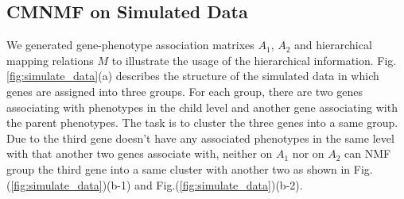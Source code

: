 \documentclass{bmcart}
\begin{document}
\subsection*{CMNMF on Simulated Data}
We generated gene-phenotype association matrixes $A_1$, $A_2$ and hierarchical mapping relations $M$ to illustrate the usage of the hierarchical information. Fig.\ref{fig:simulate_data}(a) describes the structure of the simulated data in which genes are assigned into three groups. For each group, there are two genes associating with phenotypes in the child level and another gene associating with the parent phenotypes. The task is to cluster the three genes into a same group. Due to the third gene doesn't have any associated phenotypes in the same level with that another two genes associate with, neither on $A_1$ nor on $A_2$ can NMF group the third gene into a same cluster with another two as shown in Fig.(\ref{fig:simulate_data})(b-1) and Fig.(\ref{fig:simulate_data})(b-2).
\end{document}
